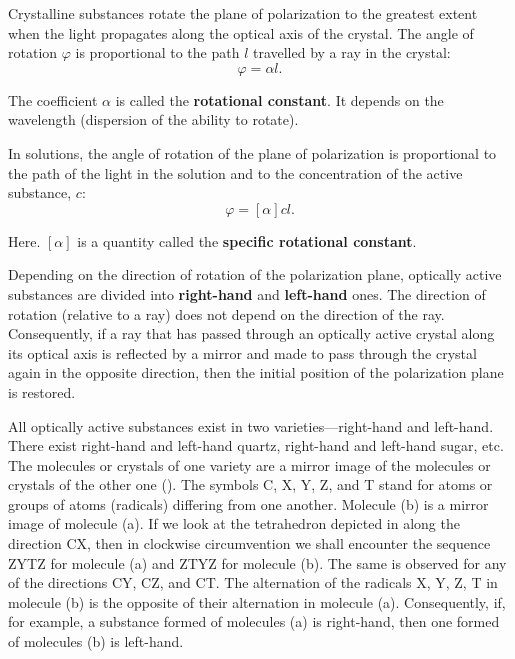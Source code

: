 Crystalline substances rotate the plane of polarization to the greatest extent when the light propagates along the optical axis of the crystal.
The angle of rotation $\varphi$ is proportional to the path $l$ travelled by a ray in the crystal:
\begin{equation}\label{eq:19_22}
	\varphi = \alpha l.
\end{equation}

\noindent
The coefficient $\alpha$ is called the \textbf{rotational constant}.
It depends on the wavelength (dispersion of the ability to rotate).

In solutions, the angle of rotation of the plane of polarization is proportional to the path of the light in the solution and to the concentration of the active substance, $c$:
\begin{equation}\label{eq:19_23}
	\varphi = [\alpha] c l.
\end{equation}

\noindent
Here. $[\alpha]$ is a quantity called the \textbf{specific rotational constant}.

Depending on the direction of rotation of the polarization plane, optically active substances are divided into \textbf{right-hand} and \textbf{left-hand} ones.
The direction of rotation (relative to a ray) does not depend on the direction of the ray.
Consequently, if a ray that has passed through an optically active crystal along its optical axis is
reflected by a mirror and made to pass through the crystal again in the opposite direction, then the initial position of the polarization plane is restored.

All optically active substances exist in two varieties---right-hand and left-hand.
There exist right-hand and left-hand quartz, right-hand and left-hand sugar, etc.
The molecules or crystals of one variety are a mirror image of the molecules or crystals of the other one ().
The symbols C, X, Y, Z, and T stand for atoms or
groups of atoms (radicals) differing from one another.
Molecule (b) is a mirror image of molecule (a).
If we look at the tetrahedron depicted in  along the direction CX, then in clockwise circumvention we shall encounter the sequence ZYTZ for molecule (a) and ZTYZ for molecule (b).
The same is observed for any of the directions CY, CZ, and CT.
The alternation of the radicals X, Y, Z, T in molecule (b) is the opposite of their alternation in molecule (a).
Consequently, if, for example, a substance formed of molecules (a) is right-hand, then one formed of molecules (b) is left-hand.

